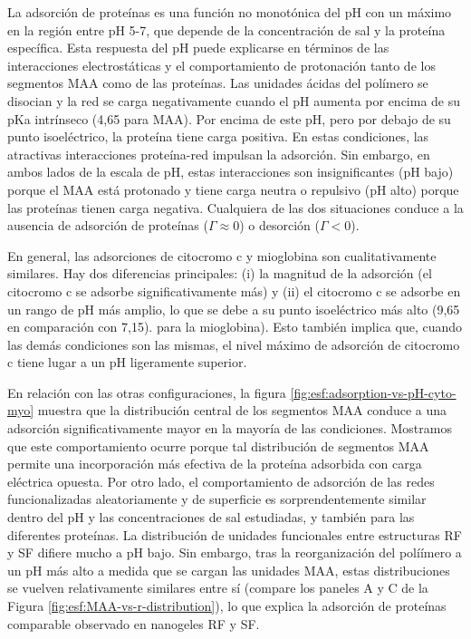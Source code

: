  La adsorci\'on de prote\'inas es una funci\'on no monot\'onica del pH con un m\'aximo en la regi\'on entre pH 5-7, que depende de la concentraci\'on de sal y la prote\'ina espec\'ifica.
 Esta respuesta del pH puede explicarse en t\'erminos de las interacciones electrost\'aticas y el comportamiento de protonaci\'on tanto de los segmentos MAA como de las prote\'inas.
 Las unidades \'acidas del pol\'imero se disocian y la red se carga negativamente cuando el pH aumenta por encima de su pKa intr\'inseco (4,65 para MAA).
 Por encima de este pH, pero por debajo de su punto isoel\'ectrico, la prote\'ina tiene carga positiva.
 En estas condiciones, las atractivas interacciones prote\'ina-red impulsan la adsorci\'on.
 Sin embargo, en ambos lados de la escala de pH, estas interacciones son insignificantes (pH bajo) porque el MAA est\'a protonado y tiene carga neutra o repulsivo (pH alto) porque las prote\'inas tienen carga negativa.
 Cualquiera de las dos situaciones conduce a la ausencia de adsorci\'on de prote\'inas ($\Gamma\approx 0$) o desorci\'on ($\Gamma< 0$).
 
 
 
 En general, las adsorciones de citocromo c y mioglobina son cualitativamente similares.
 Hay dos diferencias principales: (i) la magnitud de la adsorci\'on (el citocromo c se adsorbe significativamente m\'as) y (ii) el citocromo c se adsorbe en un rango de pH m\'as amplio, lo que se debe a su punto isoel\'ectrico m\'as alto (9,65 en comparaci\'on con 7,15). para la mioglobina).
 Esto tambi\'en implica que, cuando las dem\'as condiciones son las mismas, el nivel m\'aximo de adsorci\'on de citocromo c tiene lugar a un pH ligeramente superior.
 
 En relaci\'on con las otras configuraciones, la figura \ref{fig:esf:adsorption-vs-pH-cyto-myo} muestra que la distribuci\'on central de los segmentos MAA conduce a una adsorci\'on significativamente mayor en la mayor\'ia de las condiciones.
 Mostramos que este comportamiento ocurre porque tal distribuci\'on de segmentos MAA permite una incorporaci\'on m\'as efectiva de la prote\'ina adsorbida con carga el\'ectrica opuesta.
 Por otro lado, el comportamiento de adsorci\'on de las redes funcionalizadas aleatoriamente y de superficie es sorprendentemente similar dentro del pH y las concentraciones de sal estudiadas, y tambi\'en para las diferentes prote\'inas.
 La distribuci\'on de unidades funcionales entre estructuras RF y SF difiere mucho a pH bajo.
 Sin embargo, tras la reorganizaci\'on del polí\'imero a un pH m\'as alto a medida que se cargan las unidades MAA, estas distribuciones se vuelven relativamente similares entre s\'i (compare los paneles A y C de la Figura \ref{fig:esf:MAA-vs-r-distribution}), lo que explica la adsorci\'on de prote\'inas comparable observado en nanogeles RF y SF.




